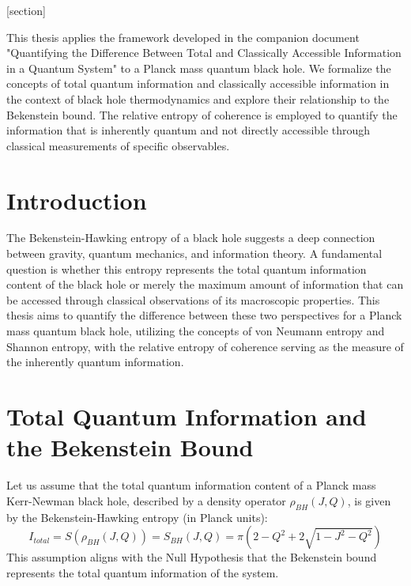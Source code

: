 





\theoremstyle{definition}
[section]













	
	
		This thesis applies the framework developed in the companion document "Quantifying the Difference Between Total and Classically Accessible Information in a Quantum System" to a Planck mass quantum black hole. We formalize the concepts of total quantum information and classically accessible information in the context of black hole thermodynamics and explore their relationship to the Bekenstein bound. The relative entropy of coherence is employed to quantify the information that is inherently quantum and not directly accessible through classical measurements of specific observables.

	
	\section{Introduction}
	
	The Bekenstein-Hawking entropy of a black hole suggests a deep connection between gravity, quantum mechanics, and information theory. A fundamental question is whether this entropy represents the total quantum information content of the black hole or merely the maximum amount of information that can be accessed through classical observations of its macroscopic properties. This thesis aims to quantify the difference between these two perspectives for a Planck mass quantum black hole, utilizing the concepts of von Neumann entropy and Shannon entropy, with the relative entropy of coherence serving as the measure of the inherently quantum information.
	
	\section{Total Quantum Information and the Bekenstein Bound}
	
	Let us assume that the total quantum information content of a Planck mass Kerr-Newman black hole, described by a density operator $\rho_{BH}(J, Q)$, is given by the Bekenstein-Hawking entropy (in Planck units):
	$$I_{total} = S(\rho_{BH}(J, Q)) = S_{BH}(J, Q) = \pi (2 - Q^2 + 2 \sqrt{1 - J^2 - Q^2})$$
	This assumption aligns with the Null Hypothesis that the Bekenstein bound represents the total quantum information of the system.
	

